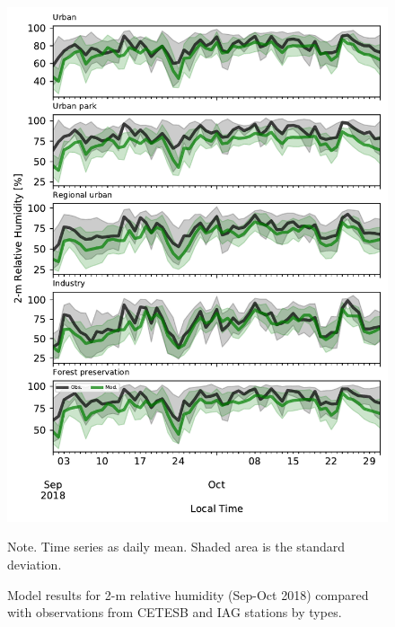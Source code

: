   
  

\begin{figure}[hbt]
  \begin{center}
  	\includegraphics[width=.8\textwidth]{fig/rh_cetesb}
  \end{center}
  \caption{Model results for 2-m relative humidity (Sep-Oct 2018) compared with observations from CETESB and IAG stations by types.}
  {\scriptsize Note. Time series as daily mean. Shaded area is the standard deviation.}
  \label{fig:rh_cetesb}
\end{figure}


